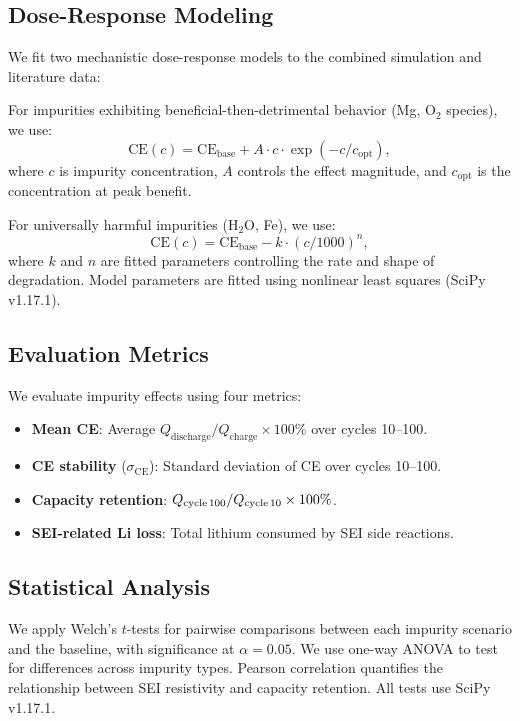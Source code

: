 \subsection{Dose-Response Modeling}
\label{sec:dose_response}

We fit two mechanistic dose-response models to the combined simulation and literature data:

For impurities exhibiting beneficial-then-detrimental behavior (Mg, O$_2$ species), we use:
\begin{equation}
    \text{CE}(c) = \text{CE}_\text{base} + A \cdot c \cdot \exp\left(-c / c_\text{opt}\right),
    \label{eq:hormesis}
\end{equation}
where $c$ is impurity concentration, $A$ controls the effect magnitude, and $c_\text{opt}$ is the concentration at peak benefit.

For universally harmful impurities (H$_2$O, Fe), we use:
\begin{equation}
    \text{CE}(c) = \text{CE}_\text{base} - k \cdot \left(c / 1000\right)^n,
    \label{eq:monotonic}
\end{equation}
where $k$ and $n$ are fitted parameters controlling the rate and shape of degradation. Model parameters are fitted using nonlinear least squares (SciPy v1.17.1).

\subsection{Evaluation Metrics}
\label{sec:metrics}

We evaluate impurity effects using four metrics:

\begin{itemize}[leftmargin=*,itemsep=2pt,topsep=2pt]
    \item \textbf{Mean CE}: Average $Q_\text{discharge}/Q_\text{charge} \times 100\%$ over cycles 10--100.
    \item \textbf{CE stability} ($\sigma_\text{CE}$): Standard deviation of CE over cycles 10--100.
    \item \textbf{Capacity retention}: $Q_\text{cycle\,100} / Q_\text{cycle\,10} \times 100\%$.
    \item \textbf{SEI-related Li loss}: Total lithium consumed by SEI side reactions.
\end{itemize}

\subsection{Statistical Analysis}
\label{sec:stats}

We apply Welch's $t$-tests for pairwise comparisons between each impurity scenario and the baseline, with significance at $\alpha=0.05$. We use one-way ANOVA to test for differences across impurity types. Pearson correlation quantifies the relationship between SEI resistivity and capacity retention. All tests use SciPy v1.17.1.
